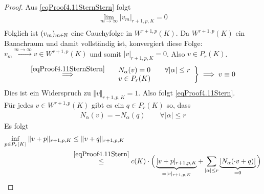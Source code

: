 \begin{proof}
Aus \eqref{eqProof4.11SternStern} folgt
\begin{align*}
\lim\limits_{m\to\infty}|v_m|_{r+1,p,K}=0\\
\end{align*}
Folglich ist $(v_m)_{m\in\mathbb{N}}$ eine Cauchyfolge in $W^{r+1,p}(K)$. Da $W^{r+1,p}(K)$ ein Banachraum und damit vollständig ist, konvergiert diese Folge: $v_m\stackrel{m\to\infty}{\longrightarrow} v\in W^{r+1,p}(K)$ und somit $|v|_{r+1,p,K}=0$. Also $v\in P_r(K)$.
\begin{align*}
\stackrel{\eqref{eqProof4.11SternStern}}{\implies}
\left.\begin{array}{ll}
&N_\alpha(v)=0\qquad\forall |\alpha|\leq r\\
& v\in P_r(K)
\end{array}\right\rbrace\implies v \equiv 0
\end{align*}
Dies ist ein Widerspruch zu $\Vert v\Vert_{r+1,p,K}=1$. Also folgt \eqref{eqProof4.11Stern}.\\
Für jedes $v\in W^{r+1,p}(K)$ gibt es ein $q\in P_r(K)$ so, dass
\begin{align*}
N_\alpha(v)=-N_\alpha(q)\qquad\forall|\alpha|\leq r
\end{align*}
Es folgt
\begin{align*}
\inf\limits_{p\in P_r(K)}\Vert v+p\Vert_{r+1,p,K}
&\leq\Vert v+q\Vert_{r+1,p,K}\\
&\overset{\eqref{eqProof4.11Stern}}{\leq}
c(K)\cdot\Big(\underbrace{|v+p|_{r+1,p,K}}_{=|v|_{r+1,p,K}}+\sum\limits_{|\alpha|\leq r}\underbrace{|N_\alpha(\cdot v+q)|}_{=0}\Big)
\end{align*}
\end{proof}


